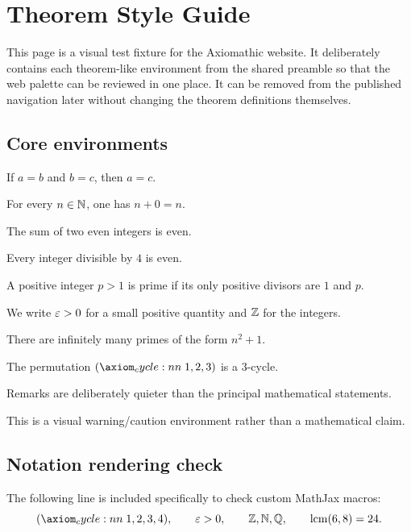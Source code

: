 \documentclass[../Axiomathic.tex]{subfiles}
\begin{document}
\chapter{Theorem Style Guide}

This page is a visual test fixture for the Axiomathic website. It deliberately
contains each theorem-like environment from the shared preamble so that the web
palette can be reviewed in one place. It can be removed from the published
navigation later without changing the theorem definitions themselves.

\section{Core environments}

\begin{theorem}
If $a=b$ and $b=c$, then $a=c$.
\end{theorem}

\begin{lemma}
For every $n\in\mathbb N$, one has $n+0=n$.
\end{lemma}

\begin{prop}
The sum of two even integers is even.
\end{prop}

\begin{corollary}
Every integer divisible by $4$ is even.
\end{corollary}

\begin{defn}
A positive integer $p>1$ is prime if its only positive divisors are $1$ and $p$.
\end{defn}

\begin{nota}
We write $\varepsilon>0$ for a small positive quantity and $\mathbb Z$ for the integers.
\end{nota}

\begin{conj}
There are infinitely many primes of the form $n^2+1$.
\end{conj}

\begin{example}
The permutation $\cycle{1,2,3}$ is a $3$-cycle.
\end{example}

\begin{remark}
Remarks are deliberately quieter than the principal mathematical statements.
\end{remark}

\begin{warning}
This is a visual warning/caution environment rather than a mathematical claim.
\end{warning}

\section{Notation rendering check}

The following line is included specifically to check custom MathJax macros:
\[
  \cycle{1,2,3,4}, \qquad \eps>0, \qquad \Z,\N,\Q, \qquad \lcm(6,8)=24.
\]
\end{document}
